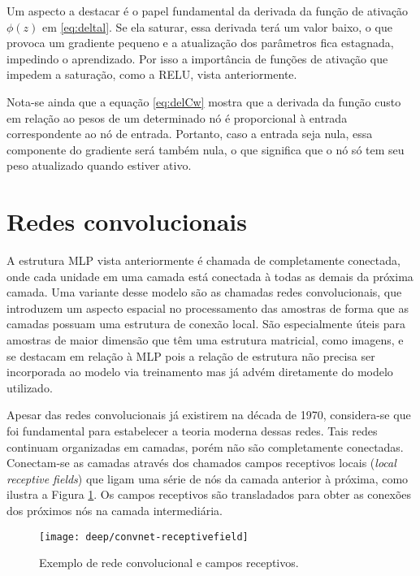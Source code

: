 Um aspecto a destacar é o papel fundamental da derivada da função de ativação $\phi(z)$ em \eqref{eq:deltal}. Se ela saturar, essa derivada terá um valor baixo, o que provoca um gradiente pequeno e a atualização dos parâmetros fica estagnada, impedindo o aprendizado. Por isso a importância de funções de ativação que impedem a saturação, como a RELU, vista anteriormente.

Nota-se ainda que a equação \eqref{eq:delCw} mostra que a derivada da função custo em relação ao pesos de um determinado nó é proporcional à entrada correspondente ao nó de entrada. Portanto, caso a entrada seja nula, essa componente do gradiente será também nula, o que significa que o nó só tem seu peso atualizado quando estiver ativo.

\section{Redes convolucionais}
\label{sec:convnets}

A estrutura MLP vista anteriormente é chamada de completamente conectada, onde cada unidade em uma camada está conectada à todas as demais da próxima camada. Uma variante desse modelo são as chamadas redes convolucionais, que introduzem um aspecto espacial no processamento das amostras de forma que as camadas possuam uma estrutura de conexão local. São especialmente úteis para amostras de maior dimensão que têm uma estrutura matricial, como imagens, e se destacam em relação à MLP pois a relação de estrutura não precisa ser incorporada ao modelo via treinamento mas já advém diretamente do modelo utilizado.

Apesar das redes convolucionais já existirem na década de 1970, considera-se que \cite{lecun1998convnet} foi fundamental para estabelecer a teoria moderna dessas redes. Tais redes continuam organizadas em camadas, porém não são completamente conectadas. Conectam-se as camadas através dos chamados campos receptivos locais (\textit{local receptive fields}) que ligam uma série de nós da camada anterior à próxima, como ilustra a Figura \ref{fig:convnet-receptivefield}. Os campos receptivos são transladados para obter as conexões dos próximos nós na camada intermediária.

\begin{figure}
\centering
\texttt{[image: deep/convnet-receptivefield]}
\caption{Exemplo de rede convolucional e campos receptivos.}
\label{fig:convnet-receptivefield}
\end{figure}

